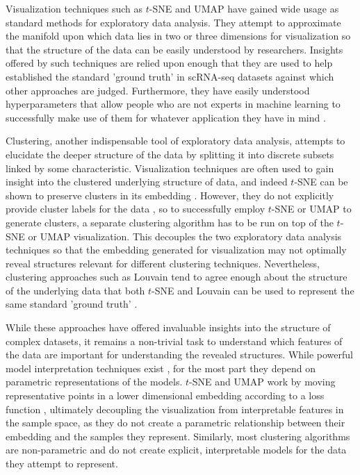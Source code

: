 \documentclass{article}
\begin{document}
Visualization techniques such as $t$-SNE \cite{maaten2008visualizing} and UMAP \cite{2018arXivUMAP} have gained wide usage as standard methods for exploratory data analysis. They attempt to approximate the manifold upon which data lies in two or three dimensions for visualization so that the structure of the data can be easily understood by researchers. Insights offered by such techniques are relied upon enough that they are used to help established the standard 'ground truth' in scRNA-seq datasets \cite{shekhar2016comprehensive} against which other approaches are judged. Furthermore, they have easily understood hyperparameters that allow people who are not experts in machine learning to successfully make use of them for whatever application they have in mind \cite{2018arXivUMAP, maaten2008visualizing}.

Clustering, another indispensable tool of exploratory data analysis, attempts to elucidate the deeper structure of the data by splitting it into discrete subsets linked by some characteristic. Visualization techniques are often used to gain insight into the clustered underlying structure of data, and indeed $t$-SNE can be shown to preserve clusters in its embedding \cite{linderman2019clustering}. However, they do not explicitly provide cluster labels for the data \cite{2018arXivUMAP, maaten2008visualizing}, so to successfully employ $t$-SNE or UMAP to generate clusters, a separate clustering algorithm has to be run on top of the $t$-SNE or UMAP visualization. This decouples the two exploratory data analysis techniques so that the embedding generated for visualization may not optimally reveal structures relevant for different clustering techniques. Nevertheless, clustering approaches such as Louvain tend to agree enough about the structure of the underlying data that both $t$-SNE and Louvain \cite{blondel2008fast} can be used to represent the same standard 'ground truth' \cite{shekhar2016comprehensive}.

While these approaches have offered invaluable insights into the structure of complex datasets, it remains a non-trivial task to understand which features of the data are important for understanding the revealed structures. While powerful model interpretation techniques exist \cite{ribeiro2016modelagnostic, NIPS2017_7062}, for the most part they depend on parametric representations of the models. $t$-SNE and UMAP work by moving representative points in a lower dimensional embedding according to a loss function \cite{2018arXivUMAP, maaten2008visualizing}, ultimately decoupling the visualization from interpretable features in the sample space, as they do not create a parametric relationship between their embedding and the samples they represent. Similarly, most clustering algorithms are non-parametric and do not create explicit, interpretable models for the data they attempt to represent. 
\end{document}
